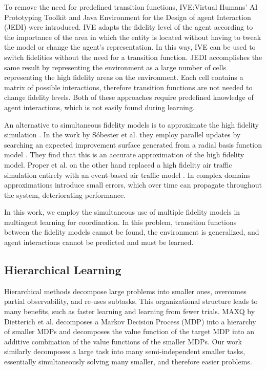 \documentclass{aamas2014}
\begin{document}
To remove the need for predefined transition functions, IVE:Virtual Humans' AI Prototyping Toolkit \cite{Brom:2007:SLD:1421879.1421881} and Java Environment for the Design of agent Interaction (JEDI) \cite{Kubera:2008:IAS:1567281.1567367} were introduced. IVE adapts the fidelity level of the agent according to the importance of the area in which the entity is located without having to tweak the model or change the agent's representation. In this way, IVE can be used to switch fidelities without the need for a transition function. JEDI accomplishes the same result by representing the environment as a large number of cells representing the high fidelity areas on the environment. Each cell contains a matrix of possible interactions, therefore transition functions are not needed to change fidelity levels. Both of these approaches require predefined knowledge of agent interactions, which is not easily found during learning.

An alternative to simultaneous fidelity models is to approximate the high fidelity simulation \cite{ Proper:2012:MDR:2343896.2344025,eps23053}. In the work by S{\'o}bester et al. they employ parallel updates by searching an expected improvement surface generated from a radial basis function model \cite{eps23053}. They find that this is an accurate approximation of the high fidelity model. Proper et al. on the other hand replaced a high fidelity air traffic simulation entirely with an event-based air traffic model \cite{Proper:2012:MDR:2343896.2344025}. In complex domains approximations introduce small errors, which over time can propagate throughout the system, deteriorating performance.
  
In this work, we employ the simultaneous use of multiple fidelity models in multiagent learning for coordination. In this problem, transition functions between the fidelity models cannot be found, the environment is generalized, and agent interactions cannot be predicted and must be learned.

\subsection{Hierarchical Learning}

Hierarchical methods decompose large problems into smaller ones, overcomes partial observability, and re-uses subtasks. This organizational structure leads to many benefits, such as faster learning and learning from fewer trials. MAXQ by Dietterich et al. \cite{Dietterich00hierarchicalreinforcement} decomposes a Markov Decision Process (MDP) into a hierarchy of smaller MDPs and decomposes the value function of the target MDP into an additive combination of the value functions of the smaller MDPs. Our work similarly decomposes a large task into many semi-independent smaller tasks, essentially simultaneously solving many smaller, and therefore easier problems.
\end{document}
